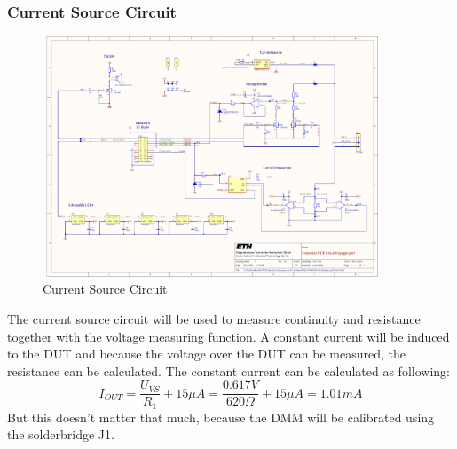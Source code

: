 \subsubsection{Current Source Circuit}

\begin{figure}[H]
	\centering
	\includegraphics[width=10cm, trim={20cm 23cm 10cm 1cm}, clip]{Resources/Pictures/Schematic_PCB_EXTENSION_CircuitVoyager_pre1.pdf}
	\caption{Current Source Circuit}
	\label{fig:Current Source Circuit}
\end{figure}

The current source circuit will be used to measure continuity and resistance together with the voltage measuring function. A constant current will be induced to the DUT and because the voltage over the DUT can be measured, the resistance can be calculated. The constant current can be calculated as following:
\[I_{OUT} = \frac{U_{VS}}{R_1} + 15\mu A = \frac{0.617V}{620\Omega} + 15\mu A = 1.01mA\]
But this doesn't matter that much, because the DMM will be calibrated using the solderbridge J1.